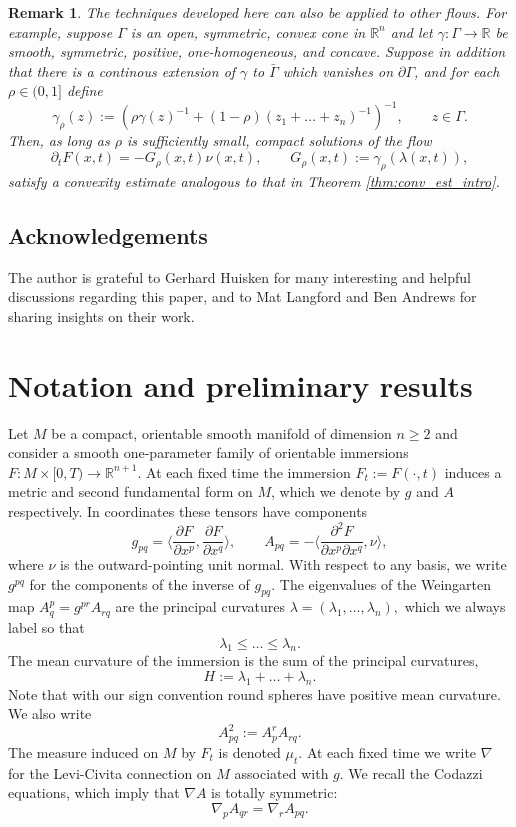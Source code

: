 \documentclass[12pt]{amsart}
\newtheorem{remark}[theorem]{Remark}
\begin{document}
\begin{remark}
The techniques developed here can also be applied to other flows. For example, suppose $\Gamma$ is an open, symmetric, convex cone in $\mathbb{R}^n$ and let $\gamma: \Gamma \to \mathbb{R}$ be smooth, symmetric, positive, one-homogeneous, and concave. Suppose in addition that there is a continous extension of $\gamma$ to $\bar \Gamma$ which vanishes on $\partial \Gamma$, and for each $\rho \in (0,1]$ define 
\[\gamma_\rho(z) := ( \rho \gamma(z)^{-1} + (1-\rho)(z_1 + \dots + z_n)^{-1} )^{-1}, \qquad  z \in \Gamma.\]
Then, as long as $\rho$ is sufficiently small, compact solutions of the flow
\[\partial_t F(x,t) = - G_\rho(x,t)\nu(x,t), \qquad G_\rho(x,t) := \gamma_\rho(\lambda(x,t)),\]
satisfy a convexity estimate analogous to that in Theorem \ref{thm:conv_est_intro}. 
\end{remark}

\subsection*{Acknowledgements} The author is grateful to Gerhard Huisken for many interesting and helpful discussions regarding this paper, and to Mat Langford and Ben Andrews for sharing insights on their work.  

\section{Notation and preliminary results}
\label{sec:notation}

Let $M$ be a compact, orientable smooth manifold of dimension $n \geq 2$ and consider a smooth one-parameter family of orientable immersions $F: M\times[0,T) \to \mathbb{R}^{n+1}.$
At each fixed time the immersion $F_t := F(\cdot,t)$ induces a metric and second fundamental form on $M$, which we denote by $g$ and $A$ respectively. In coordinates these tensors have components
\[g_{pq} = \bigg \langle \frac{\partial F}{\partial x^p}, \frac{\partial F}{\partial x^q} \bigg \rangle, \qquad A_{pq} = - \bigg \langle \frac{\partial^2 F}{\partial x^p \partial x^q}, \nu \bigg \rangle,\]
where $\nu$ is the outward-pointing unit normal. With respect to any basis, we write $g^{pq}$ for the components of the inverse of $g_{pq}$. The eigenvalues of the Weingarten map $A^p_q = g^{pr}A_{rq}$ are the principal curvatures $\lambda = (\lambda_1, \dots, \lambda_n),$
which we always label so that 
\[\lambda_1 \leq \dots \leq \lambda_n.\] The mean curvature of the immersion is the sum of the principal curvatures, 
\[H := \lambda_1 + \dots +\lambda_n.\]
Note that with our sign convention round spheres have positive mean curvature. We also write
\[A^2_{pq} := A_p^r A_{rq}.\]
The measure induced on $M$ by $F_t$ is denoted $\mu_t$. At each fixed time we write $\nabla$ for the Levi-Civita connection on $M$ associated with $g$. We recall the Codazzi equations, which imply that $\nabla A$ is totally symmetric:
\[\nabla_p A_{qr} = \nabla_r A_{pq}.\]
\end{document}
